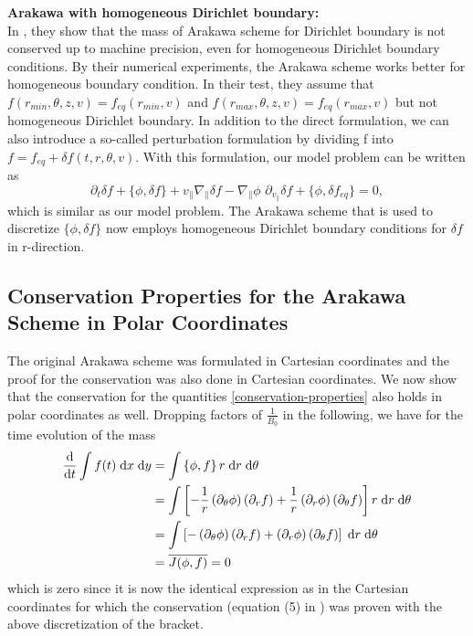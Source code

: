 \textbf{Arakawa with homogeneous Dirichlet boundary:}\\
In \cite{crouseilles2018exponential}, they show that the mass of Arakawa scheme for Dirichlet boundary is not conserved up to machine precision, even for homogeneous Dirichlet boundary conditions. By their numerical experiments, the Arakawa scheme works better for homogeneous boundary condition. In their test, they assume that $f(r_{min}, \theta,z,v)=f_{eq}(r_{min},v)$ and $f(r_{max}, \theta,z,v)=f_{eq}(r_{max},v)$ but not homogeneous Dirichlet boundary. In addition to the direct formulation, we can also introduce a so-called perturbation formulation by dividing f into $f=f_{eq}+\delta f(t,r,\theta,v)$. With this formulation, our model problem can be written as 
\begin{equation}
 \partial_t \delta f + \{\phi, \delta f \} + v_\parallel \nabla_\parallel \delta f - \nabla_\parallel \phi\,\, \partial_{v_\parallel} \delta f + \{\phi, \delta f_{eq} \}= 0,
\end{equation} 
which is similar as our model problem. The Arakawa scheme that is used to discretize $\{\phi, \delta f \}$ now employs homogeneous Dirichlet boundary conditions for $\delta f$ in r-direction.





\subsection{Conservation Properties for the Arakawa Scheme in Polar Coordinates}

The original Arakawa scheme \cite{Arakawa_1966} was formulated in Cartesian coordinates and the proof for the conservation was also done in Cartesian coordinates. We now show that the conservation for the quantities \eqref{conservation-properties} also holds in polar coordinates as well. Dropping factors of $\frac{1}{B_0}$ in the following, we have for the time evolution of the mass
\begin{subequations}
	\begin{align}
		\frac{\text{d}}{\text{d} t} \int f(t) \;\text{d} x \;\text{d} y & = \int\left\{ \phi, f \right\}r \;\text{d} r \;\text{d} \theta \\
		& = \int \left[- \frac{1}{r} \left(\partial_\theta\phi\right) \left(\partial_r f\right) + \frac{1}{r} \left(\partial_r\phi\right) \left(\partial_\theta f\right)\right] r \;\text{d} r \;\text{d} \theta \\
		& = \int \left[- \left(\partial_\theta\phi\right) \left(\partial_r f\right) + \left(\partial_r\phi\right) \left(\partial_\theta f\right)\right] \;\text{d} r \;\text{d} \theta \\
		& = \overline{J(\phi,f)} = 0
	\end{align}
\end{subequations}
which is zero since it is now the identical expression as in the Cartesian coordinates for which the conservation (equation (5) in \cite{Arakawa_1966}) was proven with the above discretization of the bracket.

